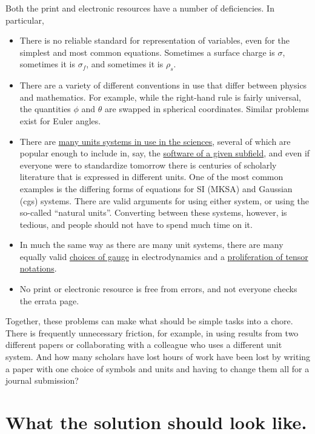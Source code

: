 \documentclass[12pt,letterpaper]{article}
\begin{document}
Both the print and electronic resources have a number of deficiencies. In particular,
\begin{itemize}
\item There is no reliable standard for representation of variables, even for the simplest and most common equations. Sometimes a surface charge is $\sigma$, sometimes it is $\sigma_f$, and sometimes it is $\rho_s$.
\item There are a variety of different conventions in use that differ between physics and mathematics. For example, while the right-hand rule is fairly universal, the quantities $\phi$ and $\theta$ are swapped in spherical coordinates. Similar problems exist for Euler angles.
\item There are \href{https://en.wikipedia.org/wiki/Systems_of_units}{many units systems in use in the sciences}, several of which are popular enough to include in, say, the \href{http://lammps.sandia.gov/doc/units.html}{software of a given subfield}, and even if everyone were to standardize tomorrow there is centuries of scholarly literature that is expressed in different units. One of the most common examples is the differing forms of equations for SI (MKSA) and Gaussian (cgs) systems. There are valid arguments for using either system, or using the so-called ``natural units''. Converting between these systems, however, is tedious, and people should not have to spend much time on it.
\item In much the same way as there are many unit systems, there are many equally valid \href{https://en.wikipedia.org/wiki/Gauge_fixing}{choices of gauge} in electrodynamics and a \href{https://en.wikipedia.org/wiki/Tensor_notation}{proliferation of tensor notations}.
\item No print or electronic resource is free from errors, and not everyone checks the errata page.
\end{itemize}

Together, these problems can make what should be simple tasks into a chore. There is frequently unnecessary friction, for example, in using results from two different papers or collaborating with a colleague who uses a different unit system. And how many scholars have lost hours of work have been lost by writing a paper with one choice of symbols and units and having to change them all for a journal submission?

\section{What the solution should look like.}
\end{document}
